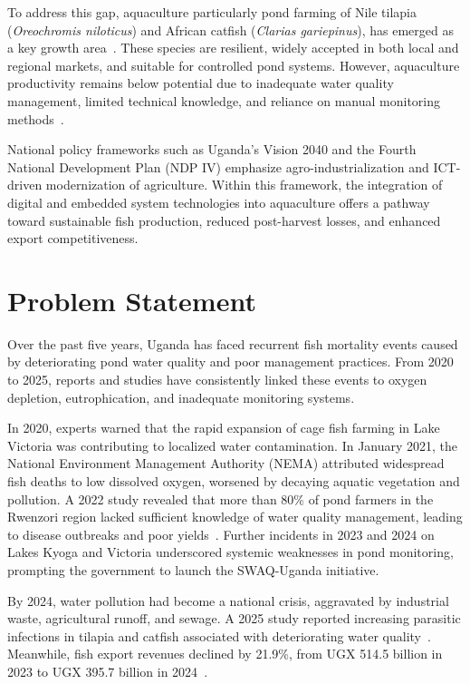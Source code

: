 \documentclass[12pt,a4paper]{report}
\begin{document}
To address this gap, aquaculture particularly pond farming of Nile tilapia (\textit{Oreochromis niloticus}) and African catfish (\textit{Clarias gariepinus}), has emerged as a key growth area~\cite{aanyu2020potential}. These species are resilient, widely accepted in both local and regional markets, and suitable for controlled pond systems. However, aquaculture productivity remains below potential due to inadequate water quality management, limited technical knowledge, and reliance on manual monitoring methods~\cite{tumwesigye2022effect}. 

National policy frameworks such as Uganda’s Vision 2040 and the Fourth National Development Plan (NDP IV) emphasize agro-industrialization and ICT-driven modernization of agriculture. Within this framework, the integration of digital and embedded system technologies into aquaculture offers a pathway toward sustainable fish production, reduced post-harvest losses, and enhanced export competitiveness.


\section{Problem Statement}
Over the past five years, Uganda has faced recurrent fish mortality events caused by deteriorating pond water quality and poor management practices. From 2020 to 2025, reports and studies have consistently linked these events to oxygen depletion, eutrophication, and inadequate monitoring systems. 

In 2020, experts warned that the rapid expansion of cage fish farming in Lake Victoria was contributing to localized water contamination. In January 2021, the National Environment Management Authority (NEMA) attributed widespread fish deaths to low dissolved oxygen, worsened by decaying aquatic vegetation and pollution. A 2022 study revealed that more than 80\% of pond farmers in the Rwenzori region lacked sufficient knowledge of water quality management, leading to disease outbreaks and poor yields~\cite{tumwesigye2022effect}. Further incidents in 2023 and 2024 on Lakes Kyoga and Victoria underscored systemic weaknesses in pond monitoring, prompting the government to launch the SWAQ-Uganda initiative.

By 2024, water pollution had become a national crisis, aggravated by industrial waste, agricultural runoff, and sewage. \newpage \noindent A 2025 study reported increasing parasitic infections in tilapia and catfish associated with deteriorating water quality~\cite{mramba2023pond}. Meanwhile, fish export revenues declined by 21.9\%, from UGX 514.5 billion in 2023 to UGX 395.7 billion in 2024~\cite{DailyMonitor2025}. 
\end{document}

